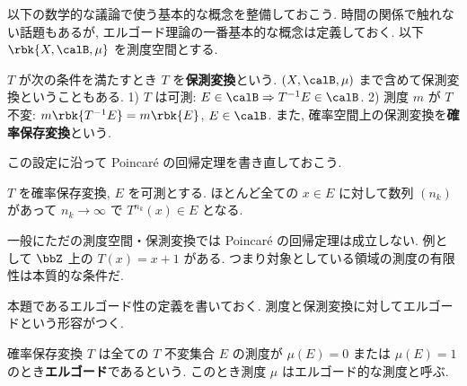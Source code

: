 \documentclass[openany, a4paper, oneside]{jsbook}
\begin{document}
以下の数学的な議論で使う基本的な概念を整備しておこう.
時間の関係で触れない話題もあるが, エルゴード理論の一番基本的な概念は定義しておく.
以下 $\rbk{X, \calB, \mu}$ を測度空間とする.
\begin{defn}
$T$ が次の条件を満たすとき $T$ を\textbf{保測変換}という.
$(X, \calB, \mu)$ まで含めて保測変換ということもある.
1) $T$ は可測: $E \in \calB \Rightarrow T^{-1} E \in \calB$.
2) 測度 $m$ が $T$ 不変: $m \rbk{T^{-1} E} = m \rbk{E}$, $E \in \calB$.
また, 確率空間上の保測変換を\textbf{確率保存変換}という.
\end{defn}
この設定に沿って Poincar\'e の回帰定理を書き直しておこう.
\begin{thm}
$T$ を確率保存変換, $E$ を可測とする.
ほとんど全ての $x \in E$ に対して数列 $(n_k)$ があって $n_k \to \infty$ で $T^{n_k}(x) \in E$ となる.
\end{thm}
\begin{rem}
一般にただの測度空間・保測変換では Poincar\'e の回帰定理は成立しない.
例として $\bbZ$ 上の $T(x)= x + 1$ がある.
つまり対象としている領域の測度の有限性は本質的な条件だ.
\end{rem}

本題であるエルゴード性の定義を書いておく.
測度と保測変換に対してエルゴードという形容がつく.
\begin{defn}
確率保存変換 $T$ は全ての $T$ 不変集合 $E$ の測度が $\mu (E) = 0$ または
$\mu (E) = 1$ のとき\textbf{エルゴード}であるという.
このとき測度 $\mu$ はエルゴード的な測度と呼ぶ.
\end{defn}
\end{document}
